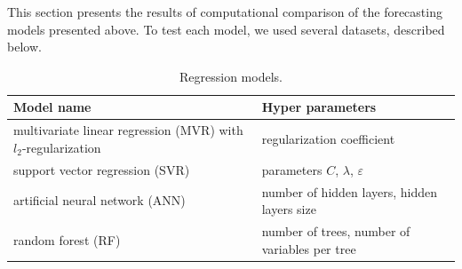 \documentclass[conference]{IEEEtran}
\begin{document}
This section presents the results of computational comparison of the forecasting models presented above. To test each model, we used several datasets, described below.
\begin{table}\caption{Regression models.}\label{tb:regr_mdl}
\begin{tabular}{|p{4cm}|p{4cm}|}
\hline
Model name & Hyper parameters \\
\hline
 multivariate linear regression (MVR) with $l_2$-regularization & regularization coefficient \\
 \hline
support vector regression (SVR) & parameters $C$, $\lambda$, $\varepsilon$ \\
\hline 
artificial neural network (ANN) &  number of hidden layers, hidden layers size \\
\hline random forest (RF) & number of trees, number of variables per tree\\
\hline
\end{tabular}
\end{table}
\end{document}

